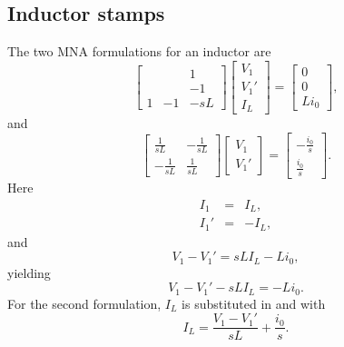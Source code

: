 \documentclass[a4paper, 12pt]{article}
\begin{document}
\subsection{Inductor stamps}

The two MNA formulations for an inductor are
%
\begin{equation}
  \begin{bmatrix}
     &  & 1 \\
     &  & -1 \\
1 & -1 & -sL
  \end{bmatrix}
  \begin{bmatrix}
    V_1 \\ V_1' \\ I_L
  \end{bmatrix}
=
\begin{bmatrix}
  0 \\ 0 \\ L i_0
\end{bmatrix},
\end{equation}
%
and
%
\begin{equation}
  \begin{bmatrix}
    \frac{1}{sL} & -\frac{1}{sL} \\
   -\frac{1}{sL} & \frac{1}{sL}
  \end{bmatrix}
  \begin{bmatrix}
    V_1 \\ V_1'
  \end{bmatrix}
=
\begin{bmatrix}
  -\frac{i_0}{s} \\ \frac{i_0}{s}
\end{bmatrix}.
\end{equation}
%
Here
%
\begin{eqnarray}
\label{eqn:L_I1}
  I_1 & = & I_L, \\
  I_1' & = & -I_L,
\label{eqn:L_I2}
\end{eqnarray}
%
and
%
\begin{equation}
 V_1 - V_1' = s L I_L - L i_0, 
\end{equation}
%
yielding
%
\begin{equation}
  V_1 - V_1' - s L I_L = -L i_0.
\end{equation}
%
For the second formulation, $I_L$ is substituted in  and
 with
%
\begin{equation}
  I_L = \frac{V_1 - V_1'}{sL} + \frac{i_0}{s}.
\end{equation}
\end{document}
